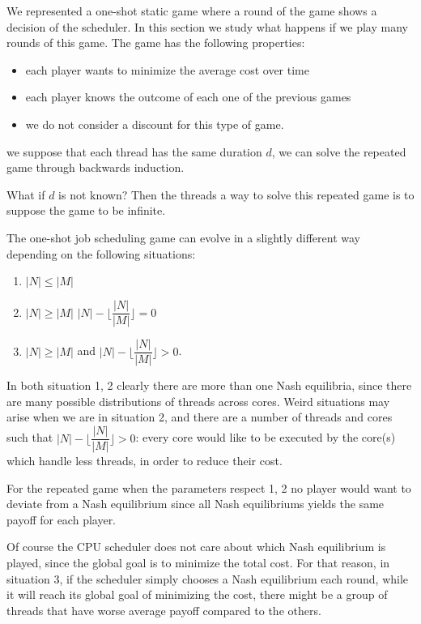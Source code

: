 We represented a one-shot static game where a round of the game shows a
decision of the scheduler. In this section we study what happens if we
play many rounds of this game. 
The game has the following properties:
\begin{itemize}
  \item each player wants to minimize the average
  cost over time
  \item each player knows the outcome of each one of the
  previous games
  \item we do not consider a discount for this type of game.
\end{itemize}

we suppose that each thread has the same duration \(d\), we can solve
the repeated game through backwards induction.

What if \(d\) is not known? Then the threads a way to solve this
repeated game is to suppose the game to be infinite.

The one-shot job scheduling game can evolve in a slightly different way
depending on the following situations:

\begin{enumerate}
\def\labelenumi{\arabic{enumi}.}
\item
  \(|N| \leq |M|\)
\item
  \(|N| \geq |M|\) \(|N| - \lfloor \dfrac{|N|}{|M|} \rfloor = 0\)
\item
  \(|N| \geq |M|\) and \(|N| - \lfloor \dfrac{|N|}{|M|} \rfloor > 0\).
\end{enumerate}

In both situation 1, 2 clearly there are more than one Nash equilibria,
since there are many possible distributions of threads across cores.
Weird situations may arise when we are in situation 2, and there are a
number of threads and cores such that
\(|N| - \lfloor \dfrac{|N|}{|M|} \rfloor > 0\): every core would like to
be executed by the core(s) which handle less threads, in order to reduce
their cost.

For the repeated game when the parameters respect 1, 2 no player would
want to deviate from a Nash equilibrium since all Nash equilibriums
yields the same payoff for each player.

Of course the CPU scheduler does not care about which Nash equilibrium
is played, since the global goal is to minimize the total cost.
For that reason, in situation 3, if the scheduler simply chooses a 
Nash equilibrium each round, while it will reach its global goal of minimizing
the cost, there might be a group of threads that have worse average payoff compared
to the others.

